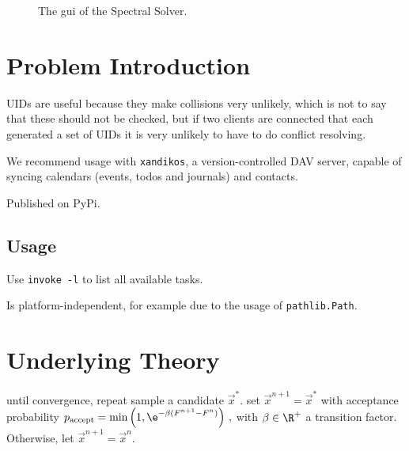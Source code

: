 \documentclass{prettytex/ox/mmsc-special-topic}
\title{\topictitle}
\author{Candidate \candidatenumber}
\date{\today}
\begin{document}
  \pagestyle{plain}
  \mmscSpecialHeader

  \begin{abstract}
    \label{abstract}
    In this project report we will review the central concepts utilised in the group work conducted to make progress in the \gls{pde} problem associated with the electrochemical model of a battery cell and present numerical results.
    \vspace*{0.2cm}

    \noindent
    \textbf{Our Goal:}
    Numerically obtain the solution $\{a(x, T), b(x, T)\}$.

    The Finite Difference schemes are implemented in Julia and Python, whereas the Spectral Method is implemented in C++.
  \end{abstract}

  \begin{figure}[H]
    \centering
    \caption{The \gls{gui} of the Spectral Solver.}
    \label{fig:gui}
  \end{figure}

  \pagebreak
  \pagestyle{normal}

  \section{Problem Introduction}
  \label{sec:introduction}

  UIDs are useful because they make collisions very unlikely, which is not to say that these should not be checked, but if two clients are connected that each generated a set of UIDs it is very unlikely to have to do conflict resolving.

  We recommend usage with \texttt{xandikos}, a version-controlled DAV server, capable of syncing calendars (events, todos and journals) and contacts.

  Published on PyPi.

  \subsection{Usage}
  Use \texttt{invoke -l} to list all available tasks.

  Is platform-independent, for example due to the usage of \texttt{pathlib.Path}.

  \section{Underlying Theory}
  \begin{algorithm}[language=pseudo,caption={\centering The Metropolis-Hastings sub-routine \parencite{metropolis, hastings}},basicstyle=\footnotesize]
until convergence, repeat
  sample a candidate $\vec{x}^*$.
  set $\vec{x}^{n+1} = \vec{x}^*$ with acceptance probability
    $p_{\rm accept} = \min\left(1, \e^{-\beta (F^{n+1} - F^n)}\right)\,,$ with $\beta \in \R^+$ a transition factor.
  Otherwise, let $\vec{x}^{n+1} = \vec{x}^{n}$.
  \end{algorithm}
\end{document}
